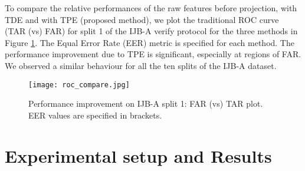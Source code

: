 \documentclass[10pt,twocolumn,letterpaper]{article}
\begin{document}
To compare the relative performances of the raw features before projection, with
TDE and with TPE (proposed method), we plot the traditional ROC curve (TAR (vs)
FAR) for split 1 of the IJB-A verify protocol for the three methods in Figure
\ref{fig:tl}. The Equal Error Rate (EER) metric is specified for each method. The performance
improvement due to TPE is significant, especially at regions of
FAR. We observed a similar behaviour for all the ten
splits of the IJB-A dataset. 

\begin{figure}
\texttt{[image: roc\_compare.jpg]}
\caption{Performance improvement on IJB-A split 1: FAR (vs) TAR plot. EER values are specified in brackets.}
\label{fig:tl}
\end{figure}

 \section{Experimental setup and Results}\label{sec:results}
\end{document}
